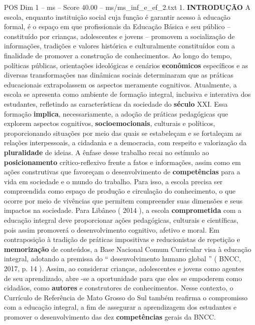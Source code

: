 \begin{textsample}{POS Dim 1 – ms – Score 40.00 – ms/ms\_inf\_e\_ef\_2.txt}  \label{ex:f1_pos_189}
1. \textbf{INTRODUÇÃO} A escola, enquanto instituição social cuja função é garantir acesso à educação formal, é o espaço em que profissionais da Educação Básica e seu público – constituído por crianças, adolescentes e jovens – promovem a socialização de informações, tradições e valores histórica e culturalmente constituídos com a finalidade de promover a construção de conhecimentos.
Ao longo do tempo, políticas públicas, orientações ideológicas e cenários \textbf{econômicos} específicos e as diversas transformações nas dinâmicas sociais determinaram que as práticas educacionais extrapolassem os aspectos meramente cognitivos.
Atualmente, a escola se apresenta como ambiente de formação integral, inclusiva e interativa dos estudantes, refletindo as características da sociedade do \textbf{século} XXI.
Essa formação \textbf{implica}, necessariamente, a adoção de práticas pedagógicas que explorem aspectos cognitivos, \textbf{socioemocionais}, culturais e políticos, proporcionando situações por meio das quais se estabeleçam e se fortaleçam as relações interpessoais, a cidadania e a democracia, com respeito e valorização da \textbf{pluralidade} de ideias.
A ênfase desse trabalho recai no estímulo ao \textbf{posicionamento} crítico-reflexivo frente a fatos e informações, assim como em ações construtivas que favoreçam o desenvolvimento de \textbf{competências} para a vida em sociedade e o mundo do trabalho.
Para isso, a escola precisa ser compreendida como espaço de produção e circulação do conhecimento, o que ocorre por meio de vivências que permitem compreender suas dimensões e seus impactos na sociedade.
Para Libâneo ( 2014 ), a escola \textbf{comprometida} com a educação integral deve proporcionar ações pedagógicas, culturais e científicas, pois assim promoverá o desenvolvimento cognitivo, afetivo e moral.
Em contraposição à tradição de práticas impositivas e reducionistas de repetição e \textbf{memorização} de conteúdos, a Base Nacional Comum Curricular visa à educação integral, adotando a premissa do “ desenvolvimento humano global ” ( BNCC, 2017, p. 14 ).
Assim, ao considerar crianças, adolescentes e jovens como agentes de seu aprendizado, abre -se a oportunidade para que eles se empoderem como cidadãos, como \textbf{autores} e construtores de conhecimentos.
Nesse contexto, o Currículo de Referência de Mato Grosso do Sul também reafirma o compromisso com a educação integral, a fim de assegurar a aprendizagem dos estudantes e promover o desenvolvimento das dez \textbf{competências} gerais da BNCC.

\end{textsample}
